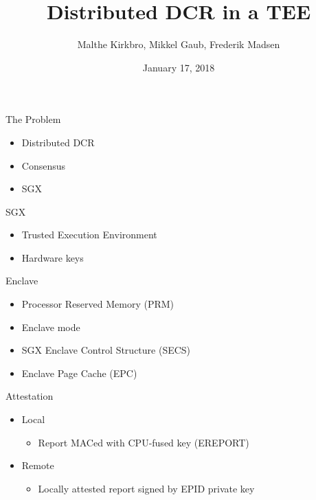 \documentclass{beamer}
\title{Distributed DCR in a TEE}
\author{Malthe Kirkbro, Mikkel Gaub, Frederik Madsen}
\date{January 17, 2018}
\begin{document}
	\begin{frame}
		\maketitle	  
	\end{frame}

	\begin{frame}{The Problem} %
		\begin{itemize}
			\item Distributed DCR
			\item Consensus
			\item SGX
		\end{itemize}
	\end{frame}

	\begin{frame}{SGX} %
		\begin{itemize}
			\item Trusted Execution Environment
			\item Hardware keys
		\end{itemize}
	\end{frame}

	\begin{frame}{Enclave} %
		\begin{itemize}
			\item Processor Reserved Memory (PRM)
			\item Enclave mode
			\item SGX Enclave Control Structure (SECS)
			\item Enclave Page Cache (EPC)
		\end{itemize}
	\end{frame}

	\begin{frame}{Attestation} %
		\begin{itemize}
			\item Local
				\begin{itemize}
					\item Report MACed with CPU-fused key (EREPORT)
				\end{itemize}
			\item Remote
				\begin{itemize}
					\item Locally attested report signed by EPID private key 
				\end{itemize}
		\end{itemize}
	\end{frame}
\end{document}
